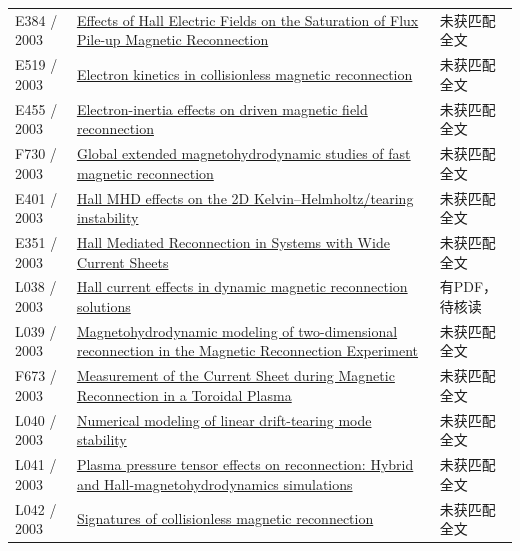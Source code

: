 \documentclass[UTF8,a4paper,11pt,openany,fontset=fandol]{ctexbook}
\begin{document}
\begin{longtable}{P{24mm}P{97mm}P{27mm}}
E384 / 2003 & \href{http://ui.adsabs.harvard.edu/abs/2003EAEJA.....7302D/abstract}{Effects of Hall Electric Fields on the Saturation of Flux Pile-up Magnetic Reconnection} & 未获匹配全文\\

E519 / 2003 & \href{https://doi.org/10.1088/0741-3335/45/12a/020}{Electron kinetics in collisionless magnetic reconnection} & 未获匹配全文\\

E455 / 2003 & \href{https://doi.org/10.1063/1.1615242}{Electron-inertia effects on driven magnetic field reconnection} & 未获匹配全文\\

F730 / 2003 & \href{https://doi.org/10.1063/1.1566026}{Global extended magnetohydrodynamic studies of fast magnetic reconnection} & 未获匹配全文\\

E401 / 2003 & \href{https://doi.org/10.1016/s0375-9601(02)01807-8}{Hall MHD effects on the 2D Kelvin–Helmholtz/tearing instability} & 未获匹配全文\\

E351 / 2003 & \href{http://ui.adsabs.harvard.edu/abs/2003APS..DPPGP1117S/abstract}{Hall Mediated Reconnection in Systems with Wide Current Sheets} & 未获匹配全文\\

L038 / 2003 & \href{https://doi.org/10.1063/1.1590980}{Hall current effects in dynamic magnetic reconnection solutions} & 有PDF，待核读\\

L039 / 2003 & \href{https://doi.org/10.1063/1.1591182}{Magnetohydrodynamic modeling of two-dimensional reconnection in the Magnetic Reconnection Experiment} & 未获匹配全文\\

F673 / 2003 & \href{https://doi.org/10.1103/physrevlett.90.035003}{Measurement of the Current Sheet during Magnetic Reconnection in a Toroidal Plasma} & 未获匹配全文\\

L040 / 2003 & \href{https://doi.org/10.1063/1.1554739}{Numerical modeling of linear drift-tearing mode stability} & 未获匹配全文\\

L041 / 2003 & \href{https://doi.org/10.1063/1.1559971}{Plasma pressure tensor effects on reconnection: Hybrid and Hall-magnetohydrodynamics simulations} & 未获匹配全文\\

L042 / 2003 & \href{https://doi.org/10.1029/2002ja009699}{Signatures of collisionless magnetic reconnection} & 未获匹配全文\\


\end{longtable}
\end{document}
